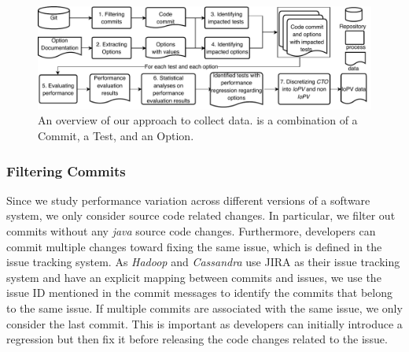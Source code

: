 \begin{figure}[t]
	\centering
		\includegraphics[width=.9\textwidth]{Figures/overview.pdf}
	\caption{An overview of our approach to collect data. \instance is a combination of a Commit, a Test, and an Option.} %
	\label{fig:overview} 
\end{figure}

\subsubsection{Filtering Commits}

Since we study performance variation across different versions of a software system, we only consider source code related changes. In particular, we filter out commits without any \emph{java} source code changes. %
Furthermore, %
developers can commit multiple changes toward fixing the same issue, which is defined in the issue tracking system. As \emph{Hadoop} and \emph{Cassandra} use JIRA as their issue tracking system and have an explicit mapping between commits and issues, we use the issue ID mentioned in the commit messages to identify the commits that belong to the same issue. If multiple commits are associated with the same issue, we only consider the last commit. This is important as developers can initially introduce a regression but then fix it before releasing the code changes related to the issue. %



